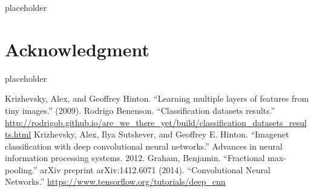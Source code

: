 \documentclass[conference]{IEEEtran}
\begin{document}
placeholder

\section*{Acknowledgment}

placeholder



\begin{thebibliography}{00}
 Krizhevsky, Alex, and Geoffrey Hinton. ``Learning multiple layers of features from tiny images.'' (2009).
 Rodrigo Benenson. ``Classification datasets results.'' \url{http://rodrigob.github.io/are_we_there_yet/build/classification_datasets_results.html}
Krizhevsky, Alex, Ilya Sutskever, and Geoffrey E. Hinton. ``Imagenet classification with deep convolutional neural networks.'' Advances in neural information processing systems. 2012.
 Graham, Benjamin. ``Fractional max-pooling.'' arXiv preprint arXiv:1412.6071 (2014).
 ``Convolutional Neural Networks.'' \url{ https://www.tensorflow.org/tutorials/deep_cnn}
\end{thebibliography}
\end{document}
